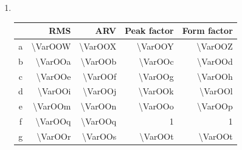 \documentclass{article}
\begin{document}
{\begin{enumerate}
\begin{tabularx}{\textwidth}{ XX }
\begin{enumerate}
					\item $i_{C}(0.0{\VarOOE}) = \SI{\VarOOV}{\ampere}$
				\end{enumerate}
				\\
			\end{tabularx}
			\item ~\\
				\begin{center}
					\begin{tabular}{ |c|r|r|r|r| } \hline
						~& \textbf{RMS} & \textbf{ARV} & \textbf{Peak factor} & \textbf{Form factor} \\ \hline
						a & \num{\VarOOW} & \num{\VarOOX} & \num{\VarOOY} & \num{\VarOOZ} \\ \hline
						b & \num{\VarOOa} & \num{\VarOOb} & \num{\VarOOc} & \num{\VarOOd} \\ \hline
						c & \num{\VarOOe} & \num{\VarOOf} & \num{\VarOOg} & \num{\VarOOh} \\ \hline
						d & \num{\VarOOi} & \num{\VarOOj} & \num{\VarOOk} & \num{\VarOOl} \\ \hline
						e & \num{\VarOOm} & \num{\VarOOn} & \num{\VarOOo} & \num{\VarOOp} \\ \hline
						f & \num{\VarOOq} & \num{\VarOOq} & \num{1} 	  & \num{1} \\ \hline
						g & \num{\VarOOr} & \num{\VarOOs} & \num{\VarOOt} & \num{\VarOOt} \\ \hline
					\end{tabular}				
				\end{center}
		\end{enumerate}
		
		\clearpage
	}
\end{document}
